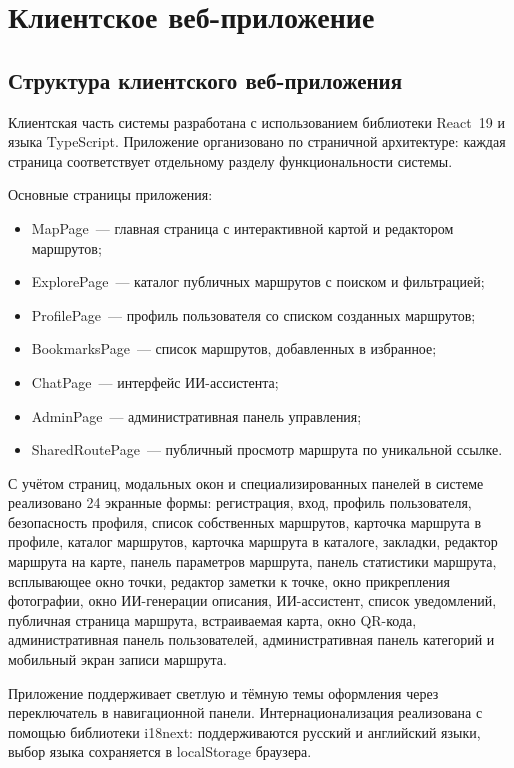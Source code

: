 \section{Клиентское веб-приложение}
\label{sec:frontend-implementation}

\subsection{Структура клиентского веб-приложения}

Клиентская часть системы разработана с использованием библиотеки React~19 и языка TypeScript. Приложение организовано по страничной архитектуре: каждая страница соответствует отдельному разделу функциональности системы.

Основные страницы приложения:
\begin{itemize}
  \item MapPage~--- главная страница с интерактивной картой и редактором маршрутов;
  \item ExplorePage~--- каталог публичных маршрутов с поиском и фильтрацией;
  \item ProfilePage~--- профиль пользователя со списком созданных маршрутов;
  \item BookmarksPage~--- список маршрутов, добавленных в избранное;
  \item ChatPage~--- интерфейс ИИ-ассистента;
  \item AdminPage~--- административная панель управления;
  \item SharedRoutePage~--- публичный просмотр маршрута по уникальной ссылке.
\end{itemize}

С учётом страниц, модальных окон и специализированных панелей в системе реализовано 24 экранные формы: регистрация, вход, профиль пользователя, безопасность профиля, список собственных маршрутов, карточка маршрута в профиле, каталог маршрутов, карточка маршрута в каталоге, закладки, редактор маршрута на карте, панель параметров маршрута, панель статистики маршрута, всплывающее окно точки, редактор заметки к точке, окно прикрепления фотографии, окно ИИ-генерации описания, ИИ-ассистент, список уведомлений, публичная страница маршрута, встраиваемая карта, окно QR-кода, административная панель пользователей, административная панель категорий и мобильный экран записи маршрута.

Приложение поддерживает светлую и тёмную темы оформления через переключатель в навигационной панели. Интернационализация реализована с помощью библиотеки i18next: поддерживаются русский и английский языки, выбор языка сохраняется в localStorage браузера.

